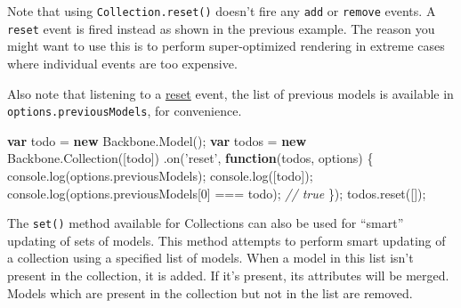 \documentclass[9pt]{book}
\newenvironment{Shaded}{}{}
\newcommand{\KeywordTok}[1]{\textcolor[rgb]{0.00,0.44,0.13}{\textbf{{#1}}}}
\newcommand{\DecValTok}[1]{\textcolor[rgb]{0.25,0.63,0.44}{{#1}}}
\newcommand{\StringTok}[1]{\textcolor[rgb]{0.25,0.44,0.63}{{#1}}}
\newcommand{\CommentTok}[1]{\textcolor[rgb]{0.38,0.63,0.69}{\textit{{#1}}}}
\newcommand{\OtherTok}[1]{\textcolor[rgb]{0.00,0.44,0.13}{{#1}}}
\newcommand{\FunctionTok}[1]{\textcolor[rgb]{0.02,0.16,0.49}{{#1}}}
\newcommand{\NormalTok}[1]{{#1}}
\begin{document}
Note that using \texttt{Collection.reset()} doesn't fire any
\texttt{add} or \texttt{remove} events. A \texttt{reset} event is fired
instead as shown in the previous example. The reason you might want to
use this is to perform super-optimized rendering in extreme cases where
individual events are too expensive.

Also note that listening to a
\href{http://backbonejs.org/\#Collection-reset}{reset} event, the list
of previous models is available in \texttt{options.previousModels}, for
convenience.

\begin{Shaded}
\begin{Highlighting}[]
\KeywordTok{var} \NormalTok{todo = }\KeywordTok{new} \OtherTok{Backbone}\NormalTok{.}\FunctionTok{Model}\NormalTok{();}
\KeywordTok{var} \NormalTok{todos = }\KeywordTok{new} \OtherTok{Backbone}\NormalTok{.}\FunctionTok{Collection}\NormalTok{([todo])}
\NormalTok{.}\FunctionTok{on}\NormalTok{(}\StringTok{'reset'}\NormalTok{, }\KeywordTok{function}\NormalTok{(todos, options) \{}
  \OtherTok{console}\NormalTok{.}\FunctionTok{log}\NormalTok{(}\OtherTok{options}\NormalTok{.}\FunctionTok{previousModels}\NormalTok{);}
  \OtherTok{console}\NormalTok{.}\FunctionTok{log}\NormalTok{([todo]);}
  \OtherTok{console}\NormalTok{.}\FunctionTok{log}\NormalTok{(}\OtherTok{options}\NormalTok{.}\FunctionTok{previousModels}\NormalTok{[}\DecValTok{0}\NormalTok{] === todo); }\CommentTok{// true}
\NormalTok{\});}
\OtherTok{todos}\NormalTok{.}\FunctionTok{reset}\NormalTok{([]);}
\end{Highlighting}
\end{Shaded}

The \texttt{set()} method available for Collections can also be used for
``smart'' updating of sets of models. This method attempts to perform
smart updating of a collection using a specified list of models. When a
model in this list isn't present in the collection, it is added. If it's
present, its attributes will be merged. Models which are present in the
collection but not in the list are removed.
\end{document}
